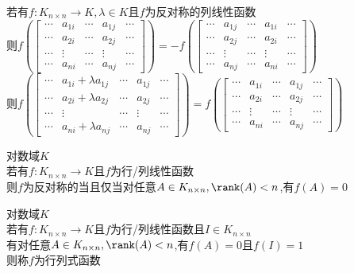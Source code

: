 \begin{dingli}
若有$f:K_{n\times n}\to K, \lambda\in K$且$f$为反对称的列线性函数\\
则$f(\begin{bmatrix}\cdots & a_{1i} & \cdots & a_{1j} & \cdots \\ \cdots & a_{2i} & \cdots & a_{2j} & \cdots \\ \cdots & \vdots & \cdots & \vdots & \cdots \\ \cdots & a_{ni} & \cdots & a_{nj} & \cdots \end{bmatrix})=-f(\begin{bmatrix}\cdots & a_{1j} & \cdots & a_{1i} & \cdots \\ \cdots & a_{2j} & \cdots & a_{2i} & \cdots \\ \cdots & \vdots & \cdots & \vdots & \cdots \\ \cdots & a_{nj} & \cdots & a_{ni} & \cdots \end{bmatrix})$\\
则$f(\begin{bmatrix}\cdots & a_{1i}+\lambda a_{1j} & \cdots & a_{1j} & \cdots \\ \cdots & a_{2i}+\lambda a_{2j} & \cdots & a_{2j} & \cdots \\ \cdots & \vdots & \cdots & \vdots & \cdots \\ \cdots & a_{ni}+\lambda a_{nj} & \cdots & a_{nj} & \cdots \end{bmatrix})=f(\begin{bmatrix}\cdots & a_{1i} & \cdots & a_{1j} & \cdots \\ \cdots & a_{2i} & \cdots & a_{2j} & \cdots \\ \cdots & \vdots & \cdots & \vdots & \cdots \\ \cdots & a_{ni} & \cdots & a_{nj} & \cdots \end{bmatrix})$\\
\end{dingli}

\begin{dingli}
对数域$K$\\
若有$f:K_{n\times n}\to K$且$f$为行/列线性函数\\
则$f$为反对称的当且仅当对任意$A\in K_{n\times n},\rank(A)<n$,有$f(A)=0$
\end{dingli}

\begin{dingyi}
对数域$K$\\
若有$f:K_{n\times n}\to K$且$f$为行/列线性函数且$I\in K_{n\times n}$\\
有对任意$A\in K_{n\times n},\rank(A)<n$,有$f(A)=0$且$f(I)=1$\\
则称$f$为行列式函数
\end{dingyi}

